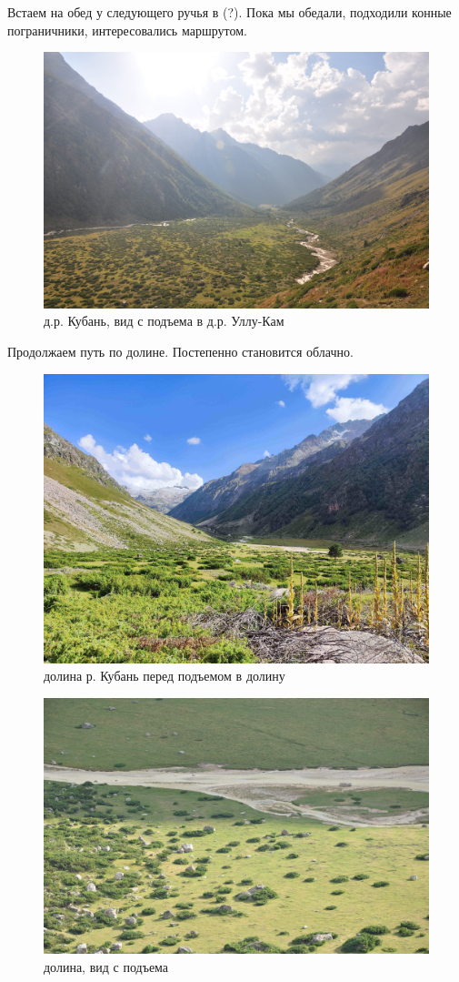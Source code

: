 Встаем на обед у следующего ручья в (?). Пока мы обедали, подходили конные пограничники, интересовались маршрутом.

\begin{figure}[h!]
	\centering
	\includegraphics[width=0.7\linewidth]{../pics/DSC_0464 2.JPG}
	\caption{д.р. Кубань, вид с подъема в д.р. Уллу-Кам}
	\label{fig:DSC_0464 2.JPG}
\end{figure}

Продолжаем путь по долине. Постепенно становится облачно.


\begin{figure}[h!]
	\centering
	\includegraphics[width=0.7\linewidth]{../pics/IMG_20240829_155915.jpg}
	\caption{долина р. Кубань перед подъемом в долину}
	\label{fig:IMG_20240829_155915.jpg}
\end{figure}

\begin{figure}[h!]
	\centering
	\includegraphics[width=0.7\linewidth]{../pics/DSC_0471 2.JPG}
	\caption{долина, вид с подъема}
	\label{fig:DSC_0471 2.JPG}
\end{figure}

